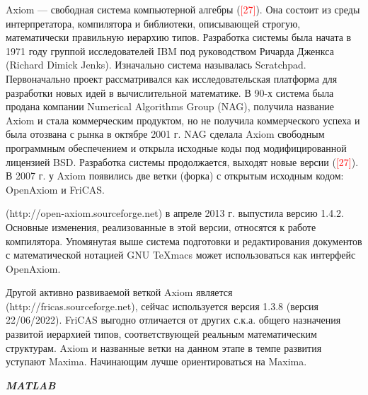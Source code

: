 Axiom --- свободная система компьютерной алгебры (\textcolor{red}{[27]}). Она состоит из среды интерпретатора, компилятора и библиотеки, описывающей строгую, математически правильную иерархию типов. Разработка системы была начата в 1971 году группой исследователей IBM под руководством Ричарда Дженкса (Richard Dimick Jenks). Изначально система называлась Scratchpad. Первоначально проект рассматривался как исследовательская платформа для разработки новых идей в вычислительной математике. В 90-х система была продана компании Numerical Algorithms Group (NAG), получила название Axiom и стала коммерческим продуктом, но не получила коммерческого успеха и была отозвана с рынка в октябре 2001 г. NAG сделала Axiom свободным программным обеспечением и открыла исходные коды под модифицированной лицензией BSD. Разработка системы продолжается, выходят новые версии (\textcolor{red}{[27]}). В 2007 г. у Axiom появились две ветки (форка) с открытым исходным кодом: OpenAxiom и FriCAS.

 (http://open-axiom.sourceforge.net) в апреле 2013 г. выпустила версию 1.4.2. Основные изменения, реализованные в этой версии, относятся к работе компилятора. Упомянутая выше система подготовки и редактирования документов с математической нотацией GNU TeXmacs может использоваться как интерфейс OpenAxiom.

Другой активно развиваемой веткой Axiom является  (http://fricas.sourceforge.net), сейчас используется версия 1.3.8 (версия 22/06/2022). FriCAS выгодно отличается от других с.к.а. общего назначения развитой иерархией типов, соответствующей реальным математическим структурам.
Axiom и названные ветки на данном этапе в темпе развития уступают Maxima. Начинающим лучше ориентироваться на Maxima.


\textbf{\textit{MATLAB}}

